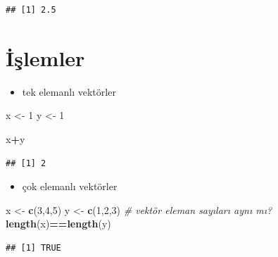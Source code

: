 \documentclass[
  oneside]{book}
\newenvironment{Shaded}{\begin{snugshade}}{\end{snugshade}}
\newcommand{\CommentTok}[1]{\textcolor[rgb]{0.56,0.35,0.01}{\textit{#1}}}
\newcommand{\DecValTok}[1]{\textcolor[rgb]{0.00,0.00,0.81}{#1}}
\newcommand{\FunctionTok}[1]{\textcolor[rgb]{0.13,0.29,0.53}{\textbf{#1}}}
\newcommand{\NormalTok}[1]{#1}
\newcommand{\OtherTok}[1]{\textcolor[rgb]{0.56,0.35,0.01}{#1}}
\newcommand{\SpecialCharTok}[1]{\textcolor[rgb]{0.81,0.36,0.00}{\textbf{#1}}}
\providecommand{\tightlist}{%
  \setlength{\itemsep}{0pt}\setlength{\parskip}{0pt}}
\begin{document}
\begin{verbatim}
## [1] 2.5
\end{verbatim}

\hypertarget{iux15flemler}{%
\section{İşlemler}\label{iux15flemler}}

\begin{itemize}
\tightlist
\item
  tek elemanlı vektörler
\end{itemize}

\begin{Shaded}
\begin{Highlighting}[]
\NormalTok{x }\OtherTok{\textless{}{-}} \DecValTok{1}
\NormalTok{y }\OtherTok{\textless{}{-}} \DecValTok{1}
\end{Highlighting}
\end{Shaded}

\begin{Shaded}
\begin{Highlighting}[]
\NormalTok{x}\SpecialCharTok{+}\NormalTok{y}
\end{Highlighting}
\end{Shaded}

\begin{verbatim}
## [1] 2
\end{verbatim}

\begin{itemize}
\tightlist
\item
  çok elemanlı vektörler
\end{itemize}

\begin{Shaded}
\begin{Highlighting}[]
\NormalTok{x }\OtherTok{\textless{}{-}} \FunctionTok{c}\NormalTok{(}\DecValTok{3}\NormalTok{,}\DecValTok{4}\NormalTok{,}\DecValTok{5}\NormalTok{)}
\NormalTok{y }\OtherTok{\textless{}{-}} \FunctionTok{c}\NormalTok{(}\DecValTok{1}\NormalTok{,}\DecValTok{2}\NormalTok{,}\DecValTok{3}\NormalTok{)}
\CommentTok{\# vektör eleman sayıları aynı mı?}
\FunctionTok{length}\NormalTok{(x)}\SpecialCharTok{==}\FunctionTok{length}\NormalTok{(y)}
\end{Highlighting}
\end{Shaded}

\begin{verbatim}
## [1] TRUE
\end{verbatim}
\end{document}
